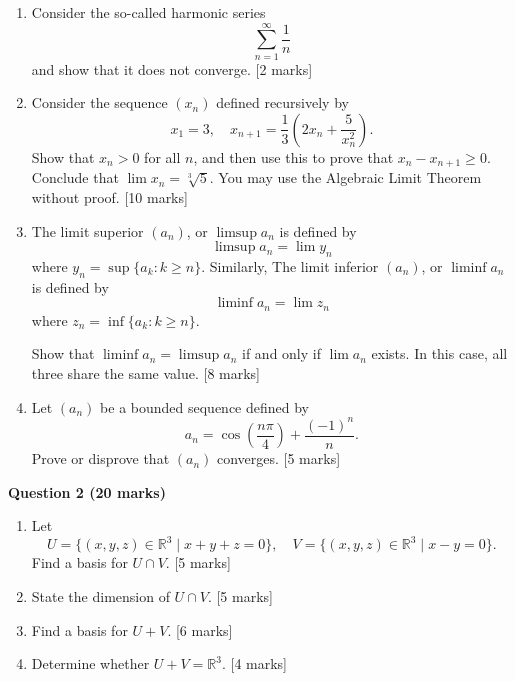 \documentclass{article}
\begin{document}
\begin{enumerate}[label=(\alph*)]
    \item Consider the so-called harmonic series
    \[
    \sum_{n=1}^\infty \frac{1}{n}
    \]
    and show that it does not converge. [2 marks]

    \item Consider the sequence \((x_n)\) defined recursively by  
    \[
    x_1 = 3, \quad x_{n+1} = \frac{1}{3}\left(2x_n + \frac{5}{x_n^2}\right).
    \]
    Show that $x_n > 0$ for all $n$, and then use this to prove that $x_n - x_{n+1} \ge 0$. Conclude that $\lim x_n = \sqrt[3]{5}$.
    You may use the Algebraic Limit Theorem without proof. [10 marks]

    \item The limit superior $(a_n)$, or $\limsup a_n$ is defined by
    \[
    \limsup a_n = \lim y_n
    \]
    where $y_n = \sup \{ a_k : k \ge n \}$. Similarly, The limit inferior $(a_n)$, or $\liminf a_n$ is defined by
    \[
    \liminf a_n = \lim z_n
    \]
    where $z_n = \inf \{ a_k : k \ge n \}$.
    
    Show that $\liminf a_n = \limsup a_n$ if and only if $\lim a_n$ exists. In this case, all three share the same value. [8 marks]

    \item Let \((a_n)\) be a bounded sequence defined by  
    \[
    a_n = \cos\left(\frac{n\pi}{4}\right) + \frac{(-1)^n}{n}.
    \]
    Prove or disprove that \((a_n)\) converges. [5 marks]
\end{enumerate}

\bigskip


\textbf{Question 2 (20 marks)}
\begin{enumerate}[label=(\alph*)]

    \item Let
    \[
    U = \{ (x,y,z) \in \mathbb{R}^3 \mid x+y+z = 0 \}, \quad V = \{(x,y,z) \in \mathbb{R}^3 \mid x-y = 0 \}.
    \]
    Find a basis for $U \cap V$. [5 marks]

    \item State the dimension of $U \cap V$. [5 marks]
    
    \item Find a basis for $U+V$. [6 marks]
    
    \item Determine whether $U+V = \mathbb{R}^3$. [4 marks]
\end{enumerate}
\end{document}
